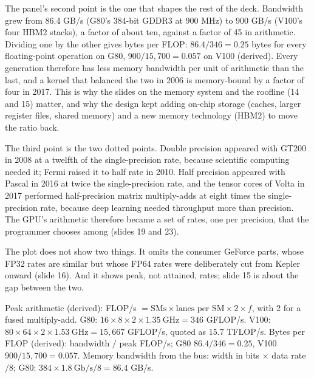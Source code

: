 \documentclass[11pt,letterpaper]{article}
\newenvironment{formulas}{\begin{tcolorbox}[formulabox]}{\end{tcolorbox}}
\begin{document}
The panel's second point is the one that shapes the rest of the deck. Bandwidth grew from 86.4 GB/s (G80's 384-bit GDDR3 at 900 MHz) to 900 GB/s (V100's four HBM2 stacks), a factor of about ten, against a factor of 45 in arithmetic. Dividing one by the other gives bytes per FLOP: $86.4 / 346 = 0.25$ bytes for every floating-point operation on G80, $900 / 15{,}700 = 0.057$ on V100 (derived). Every generation therefore has less memory bandwidth per unit of arithmetic than the last, and a kernel that balanced the two in 2006 is memory-bound by a factor of four in 2017. This is why the slides on the memory system and the roofline (14 and 15) matter, and why the design kept adding on-chip storage (caches, larger register files, shared memory) and a new memory technology (HBM2) to move the ratio back.

The third point is the two dotted points. Double precision appeared with GT200 in 2008 at a twelfth of the single-precision rate, because scientific computing needed it; Fermi raised it to half rate in 2010. Half precision appeared with Pascal in 2016 at twice the single-precision rate, and the tensor cores of Volta in 2017 performed half-precision matrix multiply-adds at eight times the single-precision rate, because deep learning needed throughput more than precision. The GPU's arithmetic therefore became a set of rates, one per precision, that the programmer chooses among (slides 19 and 23).

The plot does not show two things. It omits the consumer GeForce parts, whose FP32 rates are similar but whose FP64 rates were deliberately cut from Kepler onward (slide 16). And it shows peak, not attained, rates; slide 15 is about the gap between the two.

\begin{formulas}
Peak arithmetic (derived): FLOP/s $= \text{SMs} \times \text{lanes per SM} \times 2 \times f$, with 2 for a fused multiply-add. G80: $16 \times 8 \times 2 \times 1.35\ \text{GHz} = 346$ GFLOP/s. V100: $80 \times 64 \times 2 \times 1.53\ \text{GHz} = 15{,}667$ GFLOP/s, quoted as 15.7 TFLOP/s. Bytes per FLOP (derived): bandwidth $/$ peak FLOP/s; G80 $86.4 / 346 = 0.25$, V100 $900 / 15{,}700 = 0.057$. Memory bandwidth from the bus: width in bits $\times$ data rate $/ 8$; G80: $384 \times 1.8\ \text{Gb/s} / 8 = 86.4$ GB/s.
\end{formulas}
\end{document}
